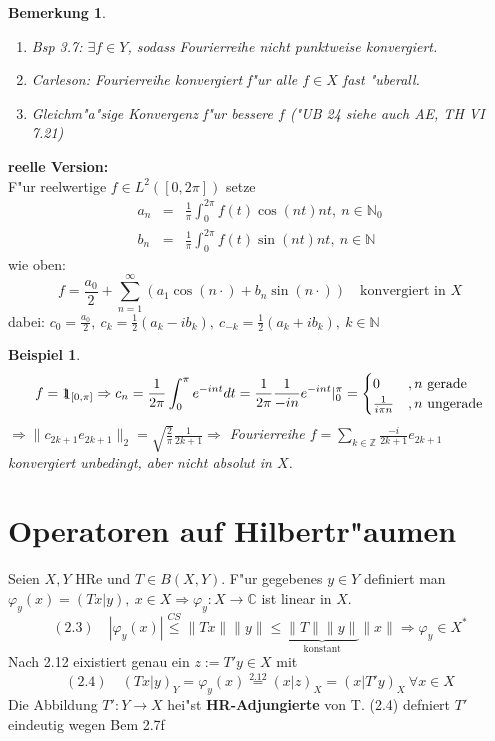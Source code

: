 \documentclass[a4paper,11pt]{book}
\newcommand{\C}{{\mathbb C}}
\newcommand{\N}{{\mathbb N}}
\newcommand{\Z}{{\mathbb Z}}
\newcommand{\begriff}[1]{\textbf{#1}} %
\newcommand{\ind}{1\hspace{-0,9ex}\raisebox{-0,2ex}{1}}
\newtheorem*{BspNO}{Beispiel}
\newtheorem*{BemNO}{Bemerkung}
\theoremstyle{nonumberplain}
\begin{document}
\begin{BemNO}
\begin{enumerate}
\item[a)] Bsp 3.7: $\exists f \in Y$, sodass Fourierreihe nicht punktweise konvergiert.

\item[b)] Carleson: Fourierreihe konvergiert f"ur alle $f \in X$ fast "uberall.

\item[c)] Gleichm"a"sige Konvergenz f"ur bessere $f$ ("UB 24 siehe auch AE, TH VI 7.21)
\end{enumerate}
\end{BemNO}


\textbf{reelle Version:}\\
F"ur reelwertige $f \in L^2([0,2\pi])$ setze
\begin{eqnarray*}
a_n &=& \frac1{\pi} \int_0^{2\pi} f(t) \cos(nt) nt,\ n \in \N_0 \\
b_n &=& \frac1{\pi} \int_0^{2\pi} f(t) \sin(nt) nt,\ n \in \N
\end{eqnarray*}
wie oben:
\[
f = \frac{a_0}2 + \sum_{n=1}^{\infty} (a_1 \cos(n \cdot) + b_n \sin(n \cdot)) \quad \text{konvergiert in } X
\]
dabei: $c_0 = \frac{a_0}2,\ c_k = \frac12 (a_k-ib_k),\ c_{-k} = \frac12 (a_k + ib_k),\ k \in \N$


\begin{BspNO}
\[
f = \ind_{[0,\pi]} \Rightarrow c_n = \frac1{2\pi} \int_0^{\pi} e^{-int} dt = \frac1{2\pi} \frac1{-in}e^{-int}|_0^{\pi} = \begin{cases}
0 &, n \text{ gerade} \\
\frac1{i \pi n} &, n \text{ ungerade}
\end{cases}
\]
$\Rightarrow \|c_{2k+1}e_{2k+1}\|_2 = \sqrt{\frac2{\pi}} \frac1{2k+1} \Rightarrow$ Fourierreihe $f = \sum_{k \in \Z} \frac{-i}{2k+1} e_{2k+1}$ konvergiert unbedingt, aber nicht absolut in $X$.
\end{BspNO}


\section{Operatoren auf Hilbertr"aumen}
Seien $X,Y$ HRe und $T \in B(X,Y)$. F"ur gegebenes $y \in Y$ definiert man $\varphi_y(x) = (Tx|y),\ x \in X \Longrightarrow \varphi_y: X \rightarrow \C$ ist linear in $X$.
\[
(2.3) \quad |\varphi_y(x)| \stackrel{CS}{\leq} \|Tx\| \|y\| \leq \underbrace{\|T\| \|y\|}_{\text{konstant}} \|x\| \Rightarrow \varphi_y \in X^{\ast}
\]
Nach 2.12 eixistiert genau ein $z:= T'y \in X$ mit
\[
(2.4) \quad (Tx|y)_Y = \varphi_y(x) \stackrel{2.12}{=} (x|z)_X = (x|T'y)_X \ \forall x \in X
\]
Die Abbildung $T': Y \rightarrow X$ hei"st \begriff{HR-Adjungierte} von T. (2.4) defniert $T'$ eindeutig wegen Bem 2.7f
\end{document}
